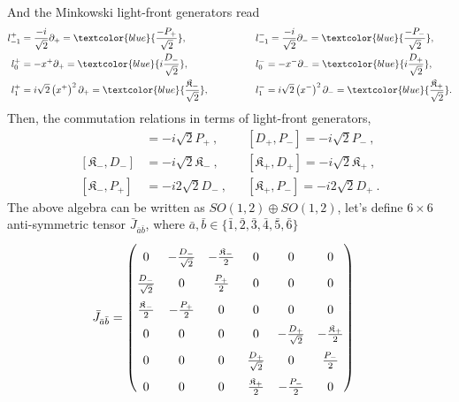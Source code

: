 \documentclass[]{article}
\numberwithin{equation}{section}
\begin{document}
{{\begin{align}
  \end{align}
And the Minkowski light-front generators read
\begin{align}
    l^{+}_{-1}&=\frac{-i}{\sqrt{2}}\partial_{+}=\textcolor{blue}{\frac{-P_{+}}{\sqrt{2}}},~~~~~~~~~~~~&&l^{-}_{-1}=\frac{-i}{\sqrt{2}}\partial_{-}=\textcolor{blue}{\frac{-P_{-}}{\sqrt{2}}},\\
    l^{+}_{0}&=-x^{+}\partial_{+}=\textcolor{blue}{i\frac{D_{-}}{\sqrt{2}}},~~~~~~~~~~~~&&l^{-}_{0}=-x^{-}\partial_{-}=\textcolor{blue}{i\frac{D_{+}}{\sqrt{2}}},\\
    l^{+}_{1}&=i\sqrt{2}\left(x^{+}\right)^{2}\partial_{+}=\textcolor{blue}{\frac{\mathfrak{K}_{-}}{\sqrt{2}}},~~~~~~~~~~~~&&l^{-}_{1}=i\sqrt{2}\left(x^{-}\right)^{2}\partial_{-}=\textcolor{blue}{\frac{\mathfrak{K}_{+}}{\sqrt{2}}}.
\end{align}
Then, the commutation relations in terms of light-front generators,
 \begin{align}
     [D_{-},P_{+}]&=-i\sqrt{2}P_{+}~,&&[D_{+},P_{-}]=-i\sqrt{2}P_{-}~,\\
     [\mathfrak{K}_{-},D_{-}]&=-i\sqrt{2}\mathfrak{K}_{-}~,&&[\mathfrak{K}_{+},D_{+}]=-i\sqrt{2}\mathfrak{K}_{+}~,\\
     [\mathfrak{K}_{-},P_{+}]&=-i2\sqrt{2}D_{-}~,&&[\mathfrak{K}_{+},P_{-}]=-i2\sqrt{2}D_{+}~.
 \end{align}
 The above algebra can be written as $SO(1,2)\oplus SO(1,2)$, let's define $6\times6$ anti-symmetric tensor $\bar{J}_{\bar{a}\bar{b}}$, where $\bar{a},\bar{b}\in\{\bar{1},\bar{2},\bar{3},\bar{4},\bar{5},\bar{6}\}$
 \begin{align}
     \bar{J}_{\bar{a}\bar{b}}&=\begin{pmatrix}
         \rule{0pt}{16pt} 0 & -\frac{D_{-}}{\sqrt{2}} & -\frac{\mathfrak{K}_{-}}{2}&0&0&0\\
         \rule{0pt}{16pt} \frac{D_{-}}{\sqrt{2}}&0& \frac{P_{+}}{2}&0&0&0\\
         \rule{0pt}{16pt} \frac{\mathfrak{K}_{-}}{2}&-\frac{P_{+}}{2}&0&0&0&0\\
         \rule{0pt}{16pt} 0&0&0&0 & -\frac{D_{+}}{\sqrt{2}} & -\frac{\mathfrak{K}_{+}}{2}\\
         \rule{0pt}{16pt}  0&0&0 &\frac{D_{+}}{\sqrt{2}}&0& \frac{P_{-}}{2}\\
          \rule{0pt}{16pt}  0&0&0 & \frac{\mathfrak{K}_{+}}{2}&-\frac{P_{-}}{2}&0
     \end{pmatrix}
 \end{align}

}}
\end{document}
